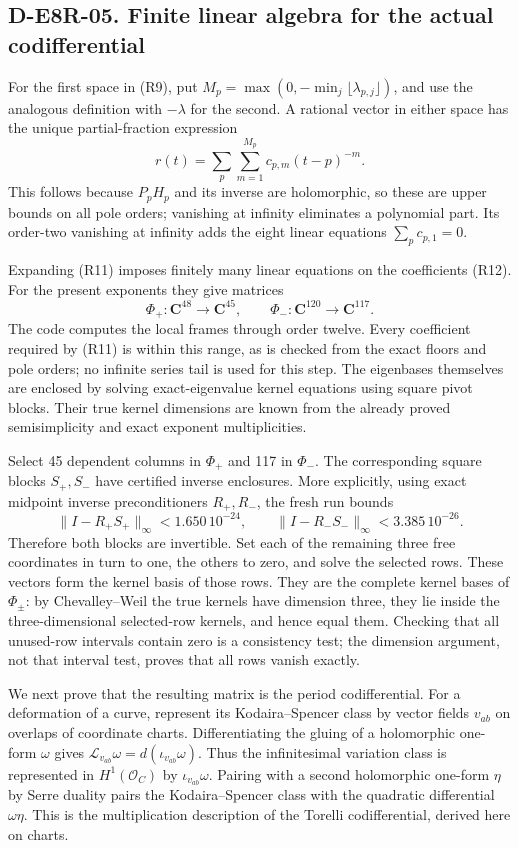 \subsection*{D-E8R-05. Finite linear algebra for the actual codifferential}
For the first space in (R9), put
$M_p=\max(0,-\min_j\lfloor\lambda_{p,j}\rfloor)$, and use the
analogous definition with $-\lambda$ for the second. A rational
vector in either space has the unique partial-fraction expression
\[
r(t)=\sum_p\sum_{m=1}^{M_p}c_{p,m}(t-p)^{-m}.
\tag{R12}
\]
This follows because $P_pH_p$ and its inverse are holomorphic,
so these are upper bounds on all pole orders; vanishing at infinity
eliminates a polynomial part. Its order-two vanishing at infinity
adds the eight linear equations $\sum_p c_{p,1}=0$.

Expanding (R11) imposes finitely many linear equations on the
coefficients (R12). For the present exponents they give matrices
\[
\Phi_+:\mathbf C^{48}\longrightarrow\mathbf C^{45},\qquad
\Phi_-:\mathbf C^{120}\longrightarrow\mathbf C^{117}.
\]
The code computes the local frames through order twelve. Every
coefficient required by (R11) is within this range, as is checked
from the exact floors and pole orders; no infinite series tail is
used for this step. The eigenbases themselves are enclosed by
solving exact-eigenvalue kernel equations using square pivot blocks.
Their true kernel dimensions are known from the already proved
semisimplicity and exact exponent multiplicities.

Select 45 dependent columns in $\Phi_+$ and 117 in $\Phi_-$.
The corresponding square blocks $S_+,S_-$ have certified inverse
enclosures. More explicitly, using exact midpoint inverse
preconditioners $R_+,R_-$, the fresh run bounds
\[
\|I-R_+S_+\|_\infty<1.650\,10^{-24},\qquad
\|I-R_-S_-\|_\infty<3.385\,10^{-26}.
\]
Therefore both blocks are invertible. Set each of the remaining
three free coordinates in turn to one, the others to zero, and solve
the selected rows. These vectors form the kernel basis of those
rows. They are the complete kernel bases of $\Phi_\pm$: by
Chevalley--Weil the true kernels have dimension three, they lie
inside the three-dimensional selected-row kernels, and hence equal
them. Checking that all unused-row intervals contain zero is a
consistency test; the dimension argument, not that interval test,
proves that all rows vanish exactly.

We next prove that the resulting matrix is the period
codifferential. For a deformation of a curve, represent its
Kodaira--Spencer class by vector fields $v_{ab}$ on overlaps of
coordinate charts. Differentiating the gluing of a holomorphic
one-form $\omega$ gives $\mathcal L_{v_{ab}}\omega
=d(\iota_{v_{ab}}\omega)$. Thus the infinitesimal variation class
is represented in $H^1(\mathcal O_C)$ by
$\iota_{v_{ab}}\omega$. Pairing with a second holomorphic one-form
$\eta$ by Serre duality pairs the Kodaira--Spencer class with the
quadratic differential $\omega\eta$. This is the multiplication
description of the Torelli codifferential, derived here on charts.

